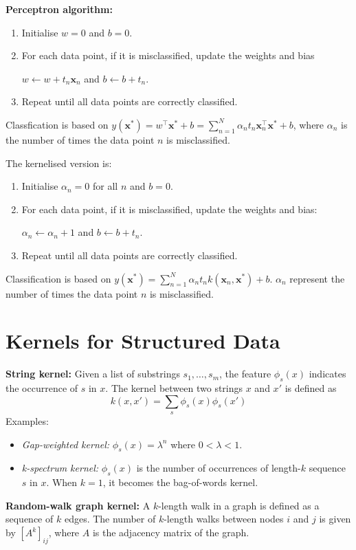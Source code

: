 \documentclass[12pt]{article}
\begin{document}
\textbf{Perceptron algorithm:}
\begin{enumerate}
\item Initialise $w = 0$ and $b = 0$. 
\item For each data point, if it is misclassified, update the weights and bias

$w \leftarrow w + t_n \boldsymbol{x}_n$ and $b \leftarrow b + t_n$. 
\item Repeat until all data points are correctly classified.
\end{enumerate}
Classfication is based on $y(\boldsymbol{x}^*) = w^\top \boldsymbol{x}^* + b = \sum_{n=1}^N \alpha_n t_n \boldsymbol{x}_n^\top \boldsymbol{x}^* + b$, where $\alpha_n$ is the number of times the data point $n$ is misclassified.

The kernelised version is: 
\begin{enumerate}
\item Initialise $\alpha_n = 0$ for all $n$ and $b = 0$. 
\item For each data point, if it is misclassified, update the weights and bias:

$\alpha_n \leftarrow \alpha_n + 1$ and $b \leftarrow b + t_n$. 
\item Repeat until all data points are correctly classified.
\end{enumerate}
Classification is based on $y(\boldsymbol{x}^*) = \sum_{n=1}^N \alpha_n t_n k(\boldsymbol{x}_n, \boldsymbol{x}^*) + b$. $\alpha_n$ represent the number of times the data point $n$ is misclassified.

\section{Kernels for Structured Data}
\textbf{String kernel:} Given a list of substrings $s_1, \dots, s_m$, the feature $\phi_s(x)$ indicates the occurrence of $s$ in $x$. The kernel between two strings $x$ and $x'$ is defined as
$$
k(x, x') = \sum_{s} \phi_s(x) \phi_s(x')
$$
Examples:
\begin{itemize}
    \item \textit{Gap-weighted kernel:} $\phi_s(x) = \lambda^n$ where $0 < \lambda < 1$.
    \item \textit{k-spectrum kernel:} $\phi_s(x)$ is the number of occurrences of length-$k$ sequence $s$ in $x$. When $k=1$, it becomes the bag-of-words kernel.
\end{itemize}

\textbf{Random-walk graph kernel:} A $k$-length walk in a graph is defined as a sequence of $k$ edges. The number of $k$-length walks between nodes $i$ and $j$ is given by $[A^k]_{ij}$, where $A$ is the adjacency matrix of the graph.
\end{document}
